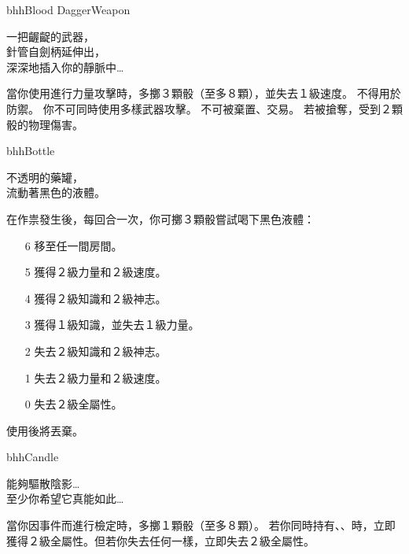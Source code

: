\linebreak[0]%
\begin{ItemCard}{bhh}{Blood Dagger}{Weapon}
  \begin{CardStory}
    一把齷齪的武器，\\
    針管自劍柄延伸出，\\
    深深地插入你的靜脈中…
  \end{CardStory}
  當你使用\ThisName{}進行力量攻擊時，多擲３顆骰（至多８顆），並失去１級速度。\smallbreak
  \ThisName{}不得用於防禦。\smallbreak
  你不可同時使用多樣武器攻擊。\smallbreak
  \ThisName{}不可被棄置、交易。\smallbreak
  若\ThisName{}被搶奪，受到２顆骰的物理傷害。\smallbreak
\end{ItemCard}%
\linebreak[0]%
\begin{ItemCard}{bhh}{Bottle}{}
  \begin{CardStory}
    不透明的藥罐，\\
    流動著黑色的液體。
  \end{CardStory}
  在作祟發生後，每回合一次，你可擲３顆骰嘗試喝下黑色液體：
  \begin{itemize}
    \item[6] 移至任一間房間。
    \item[5] 獲得２級力量和２級速度。
    \item[4] 獲得２級知識和２級神志。
    \item[3] 獲得１級知識，並失去１級力量。
    \item[2] 失去２級知識和２級神志。
    \item[1] 失去２級力量和２級速度。
    \item[0] 失去２級全屬性。
  \end{itemize}
  使用後將\ThisName{}丟棄。\smallbreak
\end{ItemCard}%
\linebreak[0]%
\begin{ItemCard}{bhh}{Candle}{}
  \begin{CardStory}
    能夠驅散陰影…\\
    至少你希望它真能如此…
  \end{CardStory}
  當你因事件而進行檢定時，多擲１顆骰（至多８顆）。\smallbreak
  若你同時持有、、時，立即獲得２級全屬性。但若你失去任何一樣，立即失去２級全屬性。\smallbreak
\end{ItemCard}%
\linebreak[0]%
